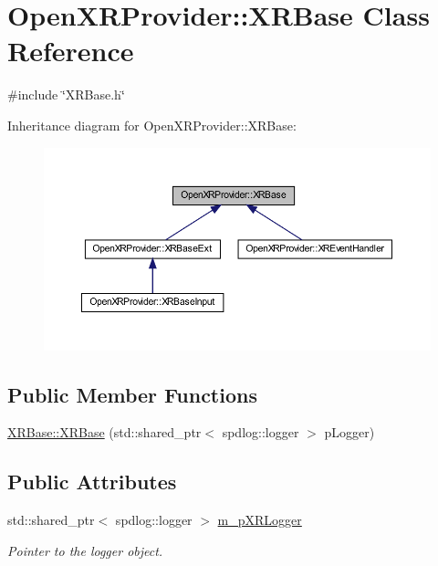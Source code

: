 \hypertarget{class_open_x_r_provider_1_1_x_r_base}{}\section{Open\+X\+R\+Provider\+::X\+R\+Base Class Reference}
\label{class_open_x_r_provider_1_1_x_r_base}


{\ttfamily \#include \char`\"{}X\+R\+Base.\+h\char`\"{}}



Inheritance diagram for Open\+X\+R\+Provider\+::X\+R\+Base\+:
\nopagebreak
\begin{figure}[H]
\begin{center}
\leavevmode
\includegraphics[width=350pt]{class_open_x_r_provider_1_1_x_r_base__inherit__graph}
\end{center}
\end{figure}
\subsection*{Public Member Functions}
\begin{DoxyCompactItemize}
\item 
\mbox{\hyperlink{class_open_x_r_provider_1_1_x_r_base_a10b7af39f9c344f6c932d1d0f6364af9}{X\+R\+Base\+::\+X\+R\+Base}} (std\+::shared\+\_\+ptr$<$ spdlog\+::logger $>$ p\+Logger)
\end{DoxyCompactItemize}
\subsection*{Public Attributes}
\begin{DoxyCompactItemize}
\item 
std\+::shared\+\_\+ptr$<$ spdlog\+::logger $>$ \mbox{\hyperlink{class_open_x_r_provider_1_1_x_r_base_ad8f2954d8fa4724f1d41076efe392c97}{m\+\_\+p\+X\+R\+Logger}}
\begin{DoxyCompactList}\small\item\em Pointer to the logger object. \end{DoxyCompactList}\end{DoxyCompactItemize}


